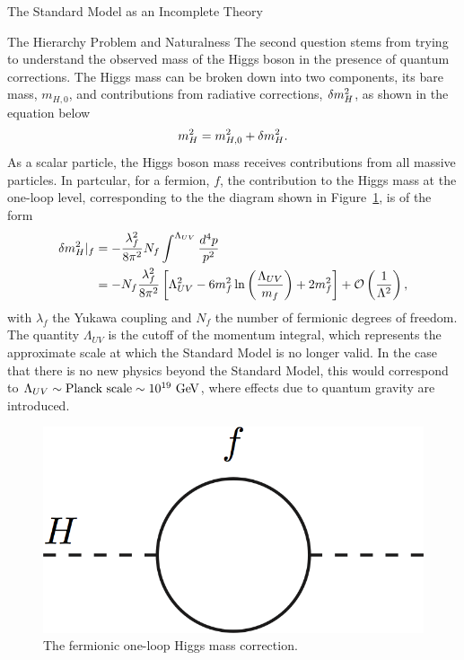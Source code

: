 \begin{section}{The Standard Model as an Incomplete Theory}
\begin{subsection}{The Hierarchy Problem and Naturalness}
The second question stems from trying to understand the observed mass of the Higgs boson in the presence of quantum corrections.
The Higgs mass can be broken down into two components, its bare mass, $m_{H,0}$, and contributions from radiative corrections, $\delta m_{H}^2$, as shown in the equation below
\begin{align}
m_{H}^2 = m_{H,0}^2 + \delta m_{H}^2.
\end{align}
As a scalar particle, the Higgs boson mass receives contributions from all massive particles.
In partcular, for a fermion, $f$, the contribution to the Higgs mass at the one-loop level, corresponding to the the diagram shown in Figure~\ref{fig:higgs_fermion_loop}, is of the form
\begin{align}
\delta m_{H}^2|_f &= -\frac{\lambda^2_f}{8\pi^2}N_f \int^{\Lambda_{UV}} \frac{d^4p}{p^2} \nonumber \\
                &= -N_f\frac{\lambda^2_f}{8\pi^2 } \left[\Lambda^2_{UV} - 6m_f^2\ln\left(\frac{\Lambda_{UV}}{m_f}\right) + 2m_f^2\right] + \mathcal{O}\left(\frac{1}{\Lambda^2}\right),
\label{eqn:higgs_fermion_correction}
\end{align}
with $\lambda_f$ the Yukawa coupling and $N_f$ the number of fermionic degrees of freedom.
The quantity $\Lambda_{UV}$ is the cutoff of the momentum integral, which represents the approximate scale at which the Standard Model is no longer valid.
In the case that there is no new physics beyond the Standard Model, this would correspond to $\Lambda_{UV} \sim \text{Planck scale} \sim 10^{19}~\mathrm{Ge\kern -0.1em V}$, where effects due to quantum gravity are introduced.

\begin{figure}[tbp!]
\begin{center}
\includegraphics[angle=0,width=0.40\columnwidth]{fig/higgs_fermion_loop.png}
\end{center}
\caption{The fermionic one-loop Higgs mass correction.}
\label{fig:higgs_fermion_loop}
\end{figure}


\end{subsection}
\end{section}
